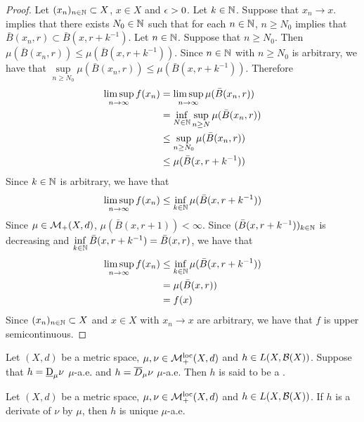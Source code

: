\documentclass{book}
\begin{document}
	\begin{proof}
		Let $(x_n)_{n \in \mathbb{N}} \subset X$, $x \in X$ and $\epsilon > 0$. Let $k \in \mathbb{N}$. Suppose that $x_n \rightarrow x$.  implies that there exists $N_0 \in \mathbb{N}$ such that for each $n \in \mathbb{N}$, $n \geq N_0$ implies that $\bar{B}(x_n, r) \subset \bar{B}(x, r + k^{-1})$. Let $n \in \mathbb{N}$. Suppose that $n \geq N_0$. Then $\mu(\bar{B}(x_n, r)) \leq  \mu(\bar{B}(x, r + k^{-1}))$. Since $n \in \mathbb{N}$ with $n \geq N_0$ is arbitrary, we have that $\sup\limits_{n \geq N_0} \mu(\bar{B}(x_n, r)) \leq \mu(\bar{B}(x, r + k^{-1}))$. Therefore
		\begin{align*}
			\limsup_{n \rightarrow \infty} f(x_n)
			& = \limsup_{n \rightarrow \infty}  \mu(\bar{B}(x_n, r)) \\
			& = \inf_{N \in \mathbb{N}} \sup_{n \geq N} \mu(\bar{B}(x_n, r)) \\
			& \leq \sup_{n \geq N_0} \mu(\bar{B}(x_n, r)) \\
			& \leq \mu(\bar{B}(x, r + k^{-1}))
		\end{align*} 
		Since $k \in \mathbb{N}$ is arbitrary, we have that 
		$$\limsup\limits_{n \rightarrow \infty} f(x_n) \leq \inf\limits_{k \in \mathbb{N}} \mu(\bar{B}(x, r + k^{-1}))$$ 
		Since $\mu \in \mathcal{M}_+(X, d)$, $\mu(\bar{B}(x, r + 1)) < \infty$. Since $(\bar{B}(x, r + k^{-1}))_{k \in \mathbb{N}}$ is decreasing and $ \inf\limits_{k \in \mathbb{N}} \bar{B}(x, r + k^{-1}) = \bar{B}(x, r)$, we have that 
		\begin{align*}
			\limsup_{n \rightarrow \infty} f(x_n)
			& \leq \inf_{k \in \mathbb{N}} \mu(\bar{B}(x, r + k^{-1})) \\
			& = \mu(\bar{B}(x, r) )\\
			& = f(x)
		\end{align*}
		Since $(x_n)_{n \in \mathbb{N}} \subset X$ and $x \in X$ with $x_n \rightarrow x$ are arbitrary, we have that $f$ is upper semicontinuous. 
	\end{proof}

	\begin{defn} 
		Let $(X, d)$ be a metric space, $\mu, \nu \in \mathcal{M}_+^{\text{loc}}(X, d)$ and $h \in L(X, \mathcal{B}(X))$. Suppose that $h = \underbar{D}_{\mu}\nu$ $\mu$-a.e. and $h = \overline{D}_{\mu}\nu$ $\mu$-a.e. Then $h$ is said to be a .
	\end{defn}

	\begin{ex} 
	Let $(X, d)$ be a metric space, $\mu, \nu \in \mathcal{M}_+^{\text{loc}}(X, d)$ and $h \in L(X, \mathcal{B}(X))$. If $h$ is a derivate of $\nu$ by $\mu$, then $h$ is unique $\mu$-a.e.
	\end{ex}
	
\end{document}
